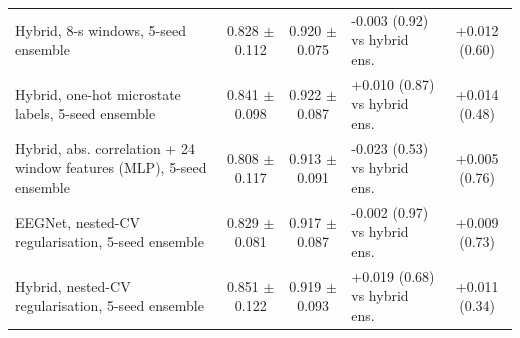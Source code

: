 \begin{table}[!t]
\begin{tabular}{p{6.2cm}ccp{3.2cm}c}
Hybrid, 8-s windows, 5-seed ensemble & 0.828 $\pm$ 0.112 & 0.920 $\pm$ 0.075 & -0.003 (0.92) vs hybrid ens. & +0.012 (0.60) \\
Hybrid, one-hot microstate labels, 5-seed ensemble & 0.841 $\pm$ 0.098 & 0.922 $\pm$ 0.087 & +0.010 (0.87) vs hybrid ens. & +0.014 (0.48) \\
Hybrid, abs. correlation + 24 window features (MLP), 5-seed ensemble & 0.808 $\pm$ 0.117 & 0.913 $\pm$ 0.091 & -0.023 (0.53) vs hybrid ens. & +0.005 (0.76) \\
EEGNet, nested-CV regularisation, 5-seed ensemble & 0.829 $\pm$ 0.081 & 0.917 $\pm$ 0.087 & -0.002 (0.97) vs hybrid ens. & +0.009 (0.73) \\
Hybrid, nested-CV regularisation, 5-seed ensemble & 0.851 $\pm$ 0.122 & 0.919 $\pm$ 0.093 & +0.019 (0.68) vs hybrid ens. & +0.011 (0.34) \\
\bottomrule
\end{tabular}
\end{table}
